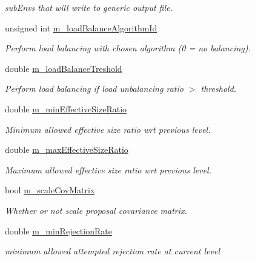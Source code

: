 \begin{DoxyCompactItemize}
\begin{DoxyCompactList}\small\item\em sub\-Envs that will write to generic output file. \end{DoxyCompactList}\item 
unsigned int \hyperlink{class_q_u_e_s_o_1_1_m_l_sampling_level_options_af8f5d4ef3048da3e201e43ecc0a399fb}{m\-\_\-load\-Balance\-Algorithm\-Id}
\begin{DoxyCompactList}\small\item\em Perform load balancing with chosen algorithm (0 = no balancing). \end{DoxyCompactList}\item 
double \hyperlink{class_q_u_e_s_o_1_1_m_l_sampling_level_options_a1cef7bbef6c1017714281e8e464367d6}{m\-\_\-load\-Balance\-Treshold}
\begin{DoxyCompactList}\small\item\em Perform load balancing if load unbalancing ratio $>$ threshold. \end{DoxyCompactList}\item 
double \hyperlink{class_q_u_e_s_o_1_1_m_l_sampling_level_options_a58904c5920d9fa6673a8222529d5c143}{m\-\_\-min\-Effective\-Size\-Ratio}
\begin{DoxyCompactList}\small\item\em Minimum allowed effective size ratio wrt previous level. \end{DoxyCompactList}\item 
double \hyperlink{class_q_u_e_s_o_1_1_m_l_sampling_level_options_a6740534c2a37694cbc3775dbf60619a1}{m\-\_\-max\-Effective\-Size\-Ratio}
\begin{DoxyCompactList}\small\item\em Maximum allowed effective size ratio wrt previous level. \end{DoxyCompactList}\item 
bool \hyperlink{class_q_u_e_s_o_1_1_m_l_sampling_level_options_ac7deaeedd0deebf8ee14414fa3dbd334}{m\-\_\-scale\-Cov\-Matrix}
\begin{DoxyCompactList}\small\item\em Whether or not scale proposal covariance matrix. \end{DoxyCompactList}\item 
double \hyperlink{class_q_u_e_s_o_1_1_m_l_sampling_level_options_a6010e1a97f0712b376653819aa6cdbca}{m\-\_\-min\-Rejection\-Rate}
\begin{DoxyCompactList}\small\item\em minimum allowed attempted rejection rate at current level \end{DoxyCompactList}\item 

\end{DoxyCompactItemize}
